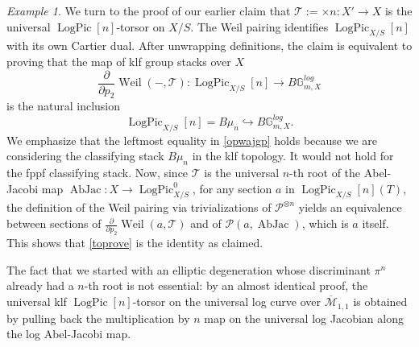 \documentclass[a4paper,11pt]{amsart} %
\numberwithin{equation}{subsection}
\newcommand{\on}[1]{\operatorname{#1}}
\newcommand{\bb}[1]{{\mathbb{#1}}}
\newcommand{\ca}[1]{{\mathcal{#1}}}
\newcommand{\hra}{\hookrightarrow}
\def\o#1{\overline{#1}}
\theoremstyle{definition}
\theoremstyle{plain}%
\theoremstyle{remark}
\newtheorem{example}[definition]{Example}
\renewcommand{\phi}{\varphi} %
\begin{document}
\begin{example}
We turn to the proof of our earlier claim that $\ca T:=\times n \colon X' \to X$ is the universal $\on{LogPic}[n]$-torsor on $X/S$. The Weil pairing identifies $\on{LogPic}_{X/S}[n]$ with its own Cartier dual. After unwrapping definitions, the claim is equivalent to proving that the map of klf group stacks over $X$
\begin{equation}\label{toprove}
    \frac{\partial}{\partial p_2}\on{Weil}(-,\ca T) \colon \on{LogPic}_{X/S}[n] \to B\bb G_{m,X}^{log}
\end{equation}
is the natural inclusion
\begin{equation}\label{opwajgp}
    \on{LogPic}_{X/S}[n]=B\mu_n \hra B\bb G_{m,X}^{log}.
\end{equation}
We emphasize that the leftmost equality in \ref{opwajgp} holds because we are considering the classifying stack $B\mu_n$ in the klf topology. It would not hold for the fppf classifying stack. %
Now, since $\ca T$ is the universal $n$-th root of the Abel-Jacobi map $\on{AbJac} \colon X \to \on{LogPic}^0_{X/S}$, for any section $a$ in $\on{LogPic}_{X/S}[n](T)$, the definition of the Weil pairing via trivializations of $\ca P^{\otimes n}$ yields an equivalence between sections of $\frac{\partial}{\partial p_2}\on{Weil}(a,\ca T)$ and of $\ca P(a,\on{AbJac})$, which is $a$ itself. This shows that \ref{toprove} is the identity as claimed.

The fact that we started with an elliptic degeneration whose discriminant $\pi^n$ already had a $n$-th root is not essential: by an almost identical proof, the universal klf $\on{LogPic}[n]$-torsor on the universal log curve over $\o{\ca M}_{1,1}$ is obtained by pulling back the multiplication by $n$ map on the universal log Jacobian along the log Abel-Jacobi map.


\end{example}
\end{document}
